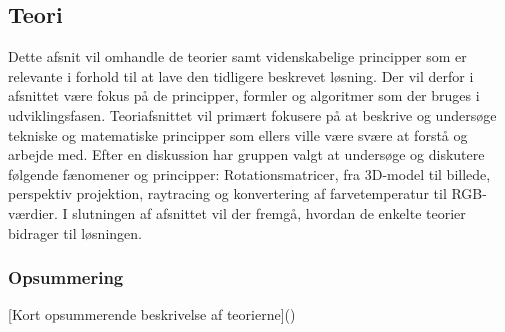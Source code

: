\subsection{Teori}

Dette afsnit vil omhandle de teorier samt videnskabelige principper som er relevante i forhold til at lave den tidligere beskrevet løsning. Der vil derfor i afsnittet være fokus på de principper, formler og algoritmer som der bruges i udviklingsfasen. Teoriafsnittet vil primært fokusere på at beskrive og undersøge tekniske og matematiske principper som ellers ville være svære at forstå og arbejde med. Efter en diskussion har gruppen valgt at undersøge og diskutere følgende fænomener og principper: Rotationsmatricer, fra 3D-model til billede, perspektiv projektion, raytracing og konvertering af farvetemperatur til RGB-værdier. I slutningen af afsnittet vil der fremgå, hvordan de enkelte teorier bidrager til løsningen.









\subsubsection*{Opsummering}

[Kort opsummerende beskrivelse af teorierne]()